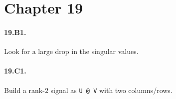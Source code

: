 \section*{Chapter 19}
\paragraph{19.B1.} Look for a large drop in the singular values.
\paragraph{19.C1.} Build a rank-$2$ signal as \texttt{U @ V} with two columns/rows.
